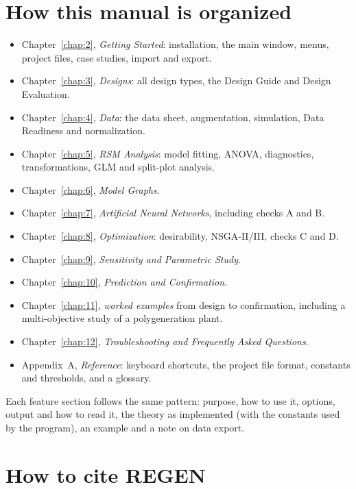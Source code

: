 \section{How this manual is organized}
\label{sec:ch01-organization}

\begin{itemize}
  \item Chapter~\ref{chap:2}, \emph{Getting Started}: installation, the main window, menus, project files, case studies,
        import and export.
  \item Chapter~\ref{chap:3}, \emph{Designs}: all design types, the Design Guide and Design Evaluation.
  \item Chapter~\ref{chap:4}, \emph{Data}: the data sheet, augmentation, simulation, Data Readiness and normalization.
  \item Chapter~\ref{chap:5}, \emph{RSM Analysis}: model fitting, ANOVA, diagnostics, transformations, GLM and split-plot
        analysis.
  \item Chapter~\ref{chap:6}, \emph{Model Graphs}.
  \item Chapter~\ref{chap:7}, \emph{Artificial Neural Networks}, including checks A and B.
  \item Chapter~\ref{chap:8}, \emph{Optimization}: desirability, NSGA-II/III, checks C and D.
  \item Chapter~\ref{chap:9}, \emph{Sensitivity and Parametric Study}.
  \item Chapter~\ref{chap:10}, \emph{Prediction and Confirmation}.
  \item Chapter~\ref{chap:11}, \emph{worked examples} from design to confirmation, including a multi-objective study
        of a polygeneration plant.
  \item Chapter~\ref{chap:12}, \emph{Troubleshooting and Frequently Asked Questions}.
  \item Appendix~A, \emph{Reference}: keyboard shortcuts, the project file format, constants and thresholds, and a
        glossary.
\end{itemize}

Each feature section follows the same pattern: purpose, how to use it, options, output and how to read it, the
theory as implemented (with the constants used by the program), an example and a note on data export.

\section{How to cite REGEN}
\label{sec:ch01-cite}

